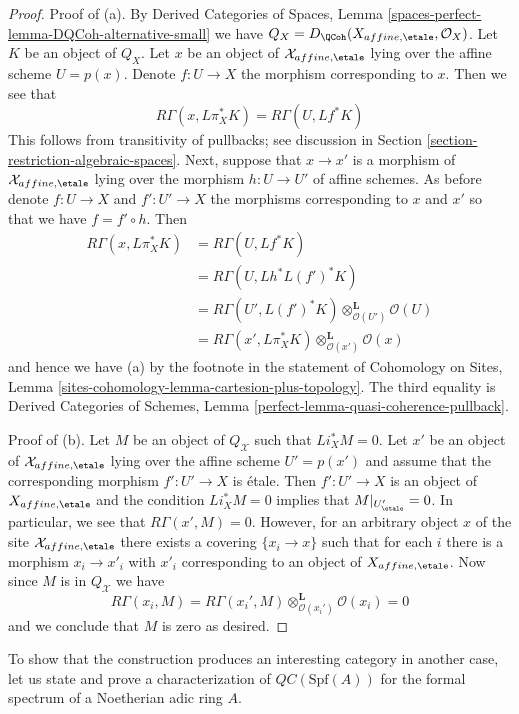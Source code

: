 \begin{proof}
\medskip\noindent
Proof of (a). By Derived Categories of Spaces, Lemma
\ref{spaces-perfect-lemma-DQCoh-alternative-small}
we have $Q_X = D_\QCoh(X_{affine, \etale}, \mathcal{O}_X)$.
Let $K$ be an object of $Q_X$. Let $x$ be an object of
$\mathcal{X}_{affine, \etale}$ lying over the affine
scheme $U = p(x)$. Denote $f : U \to X$ the morphism corresponding
to $x$. Then we see that
$$
R\Gamma(x, L\pi_X^*K) = R\Gamma(U, Lf^*K)
$$
This follows from transitivity of pullbacks; see discussion in
Section \ref{section-restriction-algebraic-spaces}.
Next, suppose that $x \to x'$ is a morphism of $\mathcal{X}_{affine, \etale}$
lying over the morphism $h : U \to U'$ of affine schemes.
As before denote $f : U \to X$ and $f' : U' \to X$ the morphisms
corresponding to $x$ and $x'$ so that we have $f = f' \circ h$.
Then
\begin{align*}
R\Gamma(x, L\pi_X^*K)
& =
R\Gamma(U, Lf^*K) \\
& =
R\Gamma(U, Lh^*L(f')^*K) \\
& =
R\Gamma(U', L(f')^*K) \otimes_{\mathcal{O}(U')}^\mathbf{L} \mathcal{O}(U) \\
& =
R\Gamma(x', L\pi_X^*K) \otimes_{\mathcal{O}(x')}^\mathbf{L} \mathcal{O}(x)
\end{align*}
and hence we have (a) by the footnote in the statement of
Cohomology on Sites, Lemma
\ref{sites-cohomology-lemma-cartesion-plus-topology}. The third equality is
Derived Categories of Schemes, Lemma
\ref{perfect-lemma-quasi-coherence-pullback}.

\medskip\noindent
Proof of (b). Let $M$ be an object of $Q_\mathcal{X}$
such that $Li_X^*M = 0$. Let $x'$ be an object of $\mathcal{X}_{affine, \etale}$
lying over the affine scheme $U' = p(x')$ and assume that the corresponding
morphism $f' : U' \to X$ is \'etale. Then $f' : U' \to X$ is an object of
$X_{affine, \etale}$ and the condition $Li_X^*M = 0$ implies that
$M|_{U'_\etale} = 0$. In particular, we see that $R\Gamma(x', M) = 0$.
However, for an arbitrary object $x$ of the site
$\mathcal{X}_{affine, \etale}$ there exists a covering $\{x_i \to x\}$
such that for each $i$ there is a morphism $x_i \to x'_i$ with
$x'_i$ corresponding to an object of $X_{affine, \etale}$.
Now since $M$ is in $Q_\mathcal{X}$ we have
$$
R\Gamma(x_i, M) =
R\Gamma(x_i', M) \otimes_{\mathcal{O}(x_i')}^\mathbf{L} \mathcal{O}(x_i) =
0
$$
and we conclude that $M$ is zero as desired.
\end{proof}

\noindent
To show that the construction produces an interesting category in another
case, let us state and prove a characterization of
$\mathit{QC}(\text{Spf}(A))$ for the formal spectrum of
a Noetherian adic ring $A$.

